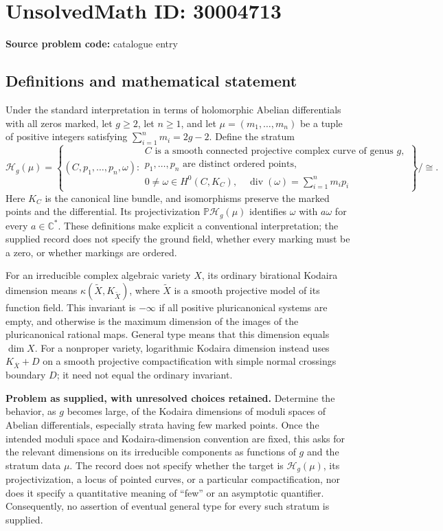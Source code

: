 \documentclass[11pt]{article}
\newcommand{\C}{\mathbb{C}}
\begin{document}
\section*{UnsolvedMath ID: 30004713}
\textbf{Source problem code:} catalogue entry
\subsection{Definitions and mathematical statement}
Under the standard interpretation in terms of holomorphic Abelian differentials with all zeros marked, let \(g\geq 2\), let \(n\geq 1\), and let \(\mu=(m_1,\ldots,m_n)\) be a tuple of positive integers satisfying \(\sum_{i=1}^n m_i=2g-2\). Define the stratum
\[
\mathcal H_g(\mu)=\left\{(C,p_1,\ldots,p_n,\omega):\begin{array}{l}C\text{ is a smooth connected projective complex curve of genus }g,\\ p_1,\ldots,p_n\text{ are distinct ordered points},\\0\neq\omega\in H^0(C,K_C),\quad \operatorname{div}(\omega)=\sum_{i=1}^n m_i p_i\end{array}\right\}/\cong.
\]
Here \(K_C\) is the canonical line bundle, and isomorphisms preserve the marked points and the differential. Its projectivization \(\mathbb P\mathcal H_g(\mu)\) identifies \(\omega\) with \(a\omega\) for every \(a\in\C^*\). These definitions make explicit a conventional interpretation; the supplied record does not specify the ground field, whether every marking must be a zero, or whether markings are ordered.

For an irreducible complex algebraic variety \(X\), its ordinary birational Kodaira dimension means \(\kappa(\widetilde X,K_{\widetilde X})\), where \(\widetilde X\) is a smooth projective model of its function field. This invariant is \(-\infty\) if all positive pluricanonical systems are empty, and otherwise is the maximum dimension of the images of the pluricanonical rational maps. General type means that this dimension equals \(\dim X\). For a nonproper variety, logarithmic Kodaira dimension instead uses \(K_{\overline X}+D\) on a smooth projective compactification with simple normal crossings boundary \(D\); it need not equal the ordinary invariant.

\textbf{Problem as supplied, with unresolved choices retained.} Determine the behavior, as \(g\) becomes large, of the Kodaira dimensions of moduli spaces of Abelian differentials, especially strata having few marked points. Once the intended moduli space and Kodaira-dimension convention are fixed, this asks for the relevant dimensions on its irreducible components as functions of \(g\) and the stratum data \(\mu\). The record does not specify whether the target is \(\mathcal H_g(\mu)\), its projectivization, a locus of pointed curves, or a particular compactification, nor does it specify a quantitative meaning of ``few'' or an asymptotic quantifier. Consequently, no assertion of eventual general type for every such stratum is supplied.
\end{document}
